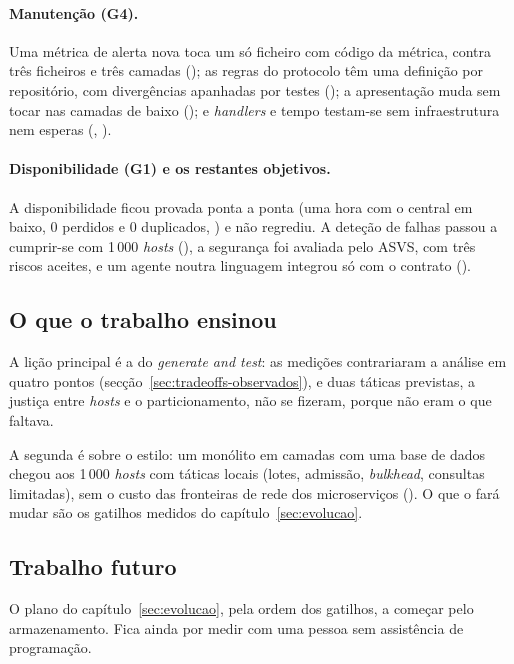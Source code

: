 \paragraph{Manutenção (G4).}
Uma métrica de alerta nova toca um só ficheiro com código da métrica, contra três ficheiros e três camadas
(); as regras do protocolo têm uma definição por repositório, com divergências apanhadas por testes
(); a apresentação muda sem tocar nas camadas de baixo (); e \emph{handlers} e tempo testam-se
sem infraestrutura nem esperas (, ).

\paragraph{Disponibilidade (G1) e os restantes objetivos.}
A disponibilidade ficou provada ponta a ponta (uma hora com o central em baixo, 0 perdidos e 0 duplicados,
) e não regrediu. A deteção de falhas passou a cumprir-se com 1\,000 \emph{hosts} (), a segurança
foi avaliada pelo ASVS, com três riscos aceites, e um agente noutra linguagem integrou só com o contrato ().

\subsection{O que o trabalho ensinou}

A lição principal é a do \emph{generate and test}: as medições contrariaram a análise em quatro pontos
(secção~\ref{sec:tradeoffs-observados}), e duas táticas previstas, a justiça entre \emph{hosts} e o
particionamento, não se fizeram, porque não eram o que faltava.

A segunda é sobre o estilo: um monólito em camadas com uma base de dados chegou aos 1\,000 \emph{hosts} com
táticas locais (lotes, admissão, \emph{bulkhead}, consultas limitadas), sem o custo das fronteiras de rede dos
microserviços (). O que o fará mudar são os gatilhos medidos do capítulo~\ref{sec:evolucao}.

\subsection{Trabalho futuro}

O plano do capítulo~\ref{sec:evolucao}, pela ordem dos gatilhos, a começar pelo armazenamento. Fica ainda por
medir  com uma pessoa sem assistência de programação.
